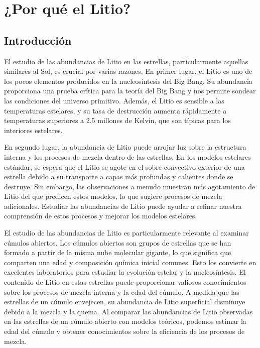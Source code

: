 
\chapter{¿Por qué el Litio?}\label{ch:primer-capitulo}

\section{Introducción}
El estudio de las abundancias de Litio en las estrellas, particularmente aquellas similares al Sol, es crucial por varias razones. En primer lugar, el Litio es uno de los pocos elementos producidos en la nucleosíntesis del Big Bang. Su abundancia proporciona una prueba crítica para la teoría del Big Bang y nos permite sondear las condiciones del universo primitivo. Además, el Litio es sensible a las temperaturas estelares, y su tasa de destrucción aumenta rápidamente a temperaturas superiores a 2.5 millones de Kelvin, que son típicas para los interiores estelares.\par

En segundo lugar, la abundancia de Litio puede arrojar luz sobre la estructura interna y los procesos de mezcla dentro de las estrellas. En los modelos estelares estándar, se espera que el Litio se agote en el sobre convectivo exterior de una estrella debido a su transporte a capas más profundas y calientes donde se destruye. Sin embargo, las observaciones a menudo muestran más agotamiento de Litio del que predicen estos modelos, lo que sugiere procesos de mezcla adicionales. Estudiar las abundancias de Litio puede ayudar a refinar nuestra comprensión de estos procesos y mejorar los modelos estelares.\par

El estudio de las abundancias de Litio es particularmente relevante al examinar cúmulos abiertos. Los cúmulos abiertos son grupos de estrellas que se han formado a partir de la misma nube molecular gigante, lo que significa que comparten una edad y composición química inicial comunes. Esto los convierte en excelentes laboratorios para estudiar la evolución estelar y la nucleosíntesis. El contenido de Litio en estas estrellas puede proporcionar valiosos conocimientos sobre los procesos de mezcla interna y la edad del cúmulo. A medida que las estrellas de un cúmulo envejecen, su abundancia de Litio superficial disminuye debido a la mezcla y la quema. Al comparar las abundancias de Litio observadas en las estrellas de un cúmulo abierto con modelos teóricos, podemos estimar la edad del cúmulo y obtener conocimientos sobre la eficiencia de los procesos de mezcla.\par

